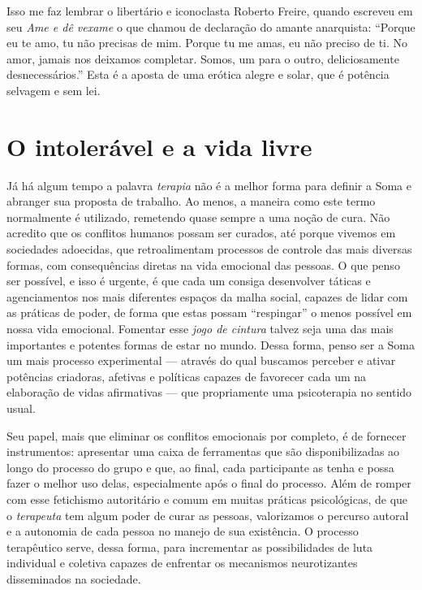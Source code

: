 Isso me faz lembrar o libertário e iconoclasta Roberto Freire, quando
escreveu em seu \emph{Ame e dê vexame} o que chamou de declaração do amante
anarquista: ``Porque eu te amo, tu não precisas de mim. Porque tu me
amas, eu não preciso de ti. No amor, jamais nos deixamos completar.
Somos, um para o outro, deliciosamente desnecessários.'' Esta é a aposta
de uma erótica alegre e solar, que é potência selvagem e sem lei.

\section{O intolerável e a vida livre}

Já há algum tempo a palavra \emph{terapia} não é a melhor forma para
definir a Soma e abranger sua proposta de trabalho. Ao menos, a maneira
como este termo normalmente é utilizado, remetendo quase sempre a uma
noção de cura. Não acredito que os conflitos humanos possam ser curados,
até porque vivemos em sociedades adoecidas, que retroalimentam processos
de controle das mais diversas formas, com consequências diretas na vida
emocional das pessoas. O que penso ser possível, e isso é urgente, é que
cada um consiga desenvolver táticas e agenciamentos nos mais diferentes
espaços da malha social, capazes de lidar com as práticas de poder, de
forma que estas possam ``respingar'' o menos possível em nossa vida
emocional. Fomentar esse \emph{jogo de cintura} talvez seja uma das mais
importantes e potentes formas de estar no mundo.
Dessa forma, penso ser a Soma um mais processo experimental --- através do
qual buscamos perceber e ativar potências criadoras, afetivas e
políticas capazes de favorecer cada um na elaboração de vidas
afirmativas --- que propriamente uma psicoterapia no sentido usual.

Seu papel, mais que eliminar os conflitos emocionais por completo, é de
fornecer instrumentos: apresentar uma caixa de ferramentas que são
disponibilizadas ao longo do processo do grupo e que, ao final, cada
participante as tenha e possa fazer o melhor uso delas, especialmente
após o final do processo. Além de romper com esse fetichismo autoritário
e comum em muitas práticas psicológicas, de que o \emph{terapeuta} tem
algum poder de curar as pessoas, valorizamos o percurso autoral e a
autonomia de cada pessoa no manejo de sua existência. O processo
terapêutico serve, dessa forma, para incrementar as possibilidades de
luta individual e coletiva capazes de enfrentar os mecanismos
neurotizantes disseminados na sociedade.

